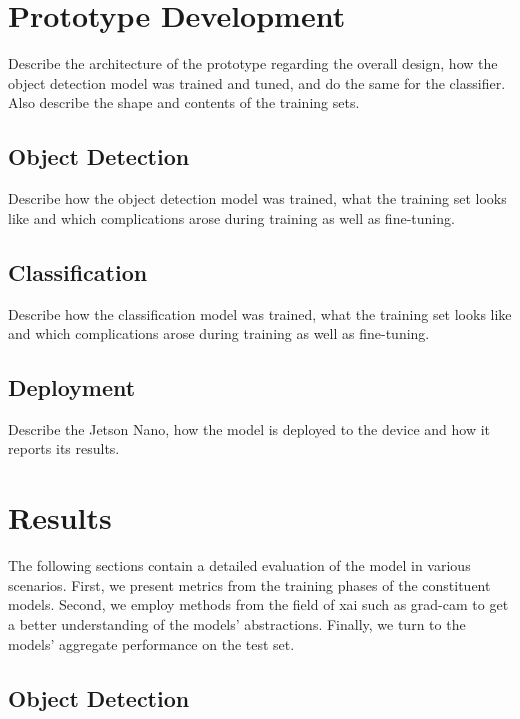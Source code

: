 \documentclass[draft,final]{vutinfth} %
\begin{document}
\chapter{Prototype Development}
\label{chap:development}

Describe the architecture of the prototype regarding the overall
design, how the object detection model was trained and tuned, and do
the same for the classifier. Also describe the shape and contents of
the training sets.

\section{Object Detection}
\label{sec:development-detection}

Describe how the object detection model was trained, what the training
set looks like and which complications arose during training as well
as fine-tuning.

\section{Classification}
\label{sec:Classification}

Describe how the classification model was trained, what the training
set looks like and which complications arose during training as well
as fine-tuning.

\section{Deployment}

Describe the Jetson Nano, how the model is deployed to the device and
how it reports its results.

\chapter{Results}
\label{chap:results}

The following sections contain a detailed evaluation of the model in
various scenarios. First, we present metrics from the training phases
of the constituent models. Second, we employ methods from the field of
\gls{xai} such as \gls{grad-cam} to get a better understanding of the
models' abstractions. Finally, we turn to the models' aggregate
performance on the test set.

\section{Object Detection}
\label{sec:yolo-eval}
\end{document}

